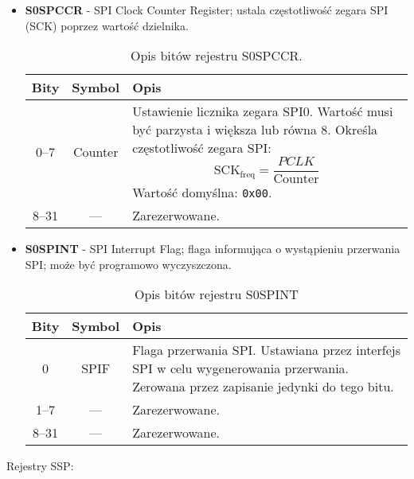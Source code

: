 \begin{itemize}
    
    \item \textbf{S0SPCCR} - SPI Clock Counter Register; ustala częstotliwość zegara SPI (SCK) poprzez wartość dzielnika.

\begin{table}[H]
\centering
\caption{Opis bitów rejestru S0SPCCR.}
\vspace{0.5em}
\renewcommand{\arraystretch}{1.2}
\begin{tabular}{|c|c|p{9.5cm}|}
\hline
\textbf{Bity} & \textbf{Symbol} & \textbf{Opis} \\
\hline
0–7     & Counter    & Ustawienie licznika zegara SPI0. \newline Wartość musi być parzysta i większa lub równa 8. Określa częstotliwość zegara SPI:  
\[ \text{SCK}_{\text{freq}} = \frac{PCLK}{\text{Counter}} \]
\newline Wartość domyślna: \texttt{0x00}. \\
\hline
8–31    & —          & Zarezerwowane.\\
\hline
\end{tabular}
\end{table}

    
    \item \textbf{S0SPINT} - SPI Interrupt Flag; flaga informująca o wystąpieniu przerwania SPI; może być programowo wyczyszczona.

    \begin{table}[H]
\centering
\caption{Opis bitów rejestru S0SPINT}
\vspace{0.5em}
\renewcommand{\arraystretch}{1.2}
\begin{tabular}{|c|c|p{9.5cm}|}
\hline
\textbf{Bity} & \textbf{Symbol} & \textbf{Opis} \\
\hline
0     & SPIF       & Flaga przerwania SPI. Ustawiana przez interfejs SPI w celu wygenerowania przerwania. \newline Zerowana przez zapisanie jedynki do tego bitu. \newline \\
\hline
1–7   & —          & Zarezerwowane.\\
\hline
8–31  & —          & Zarezerwowane. \\
\hline
\end{tabular}
\end{table}
\end{itemize}
Rejestry SSP:
